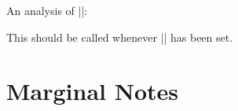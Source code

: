   \begin{macro}{\@dbflt}
  \begin{macro}{\@xdblfloat}
    \begin{teX}
\def\@dbflt#1{\@ifnextchar[{\@xdblfloat{#1}}{\@xdblfloat{#1}[tp]}}
\def\@xdblfloat#1[#2]{%
  \@xfloat{#1}[#2]\hsize\textwidth\linewidth\textwidth}
    \end{teX}
  \end{macro}
  \end{macro}

    \begin{teX}
\newcount\c@topnumber
\newcount\c@dbltopnumber
\newcount\c@bottomnumber
\newcount\c@totalnumber
    \end{teX}

 An analysis of |\@floatplacement|:

 This should be called whenever |\@colht| has been set.
    \begin{teX}
\def\@floatplacement{\global\@topnum\c@topnumber
   \global\@toproom \topfraction\@colht
   \global\@botnum  \c@bottomnumber
   \global\@botroom \bottomfraction\@colht
   \global\@colnum  \c@totalnumber
   \@fpmin   \floatpagefraction\@colht}
    \end{teX}

% 
%    
\def \@dblfloatplacement {%
  \global \@dbltopnum \c@dbltopnumber
  \global \@dbltoproom \dbltopfraction\@colht
  \@textmin \@colht
  \advance \@textmin -\@dbltoproom
  \@fpmin \dblfloatpagefraction\textheight
  \@fptop \@dblfptop
  \@fpsep \@dblfpsep
  \@fpbot \@dblfpbot
}
%
\section{Marginal Notes}

